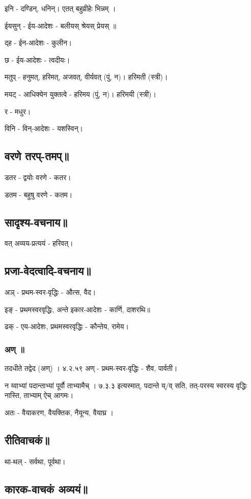 \documentclass[oneside, article]{memoir}
\begin{document}
इनि - दण्डिन्, धनिन्। एतत् बहुव्रीहेः भिन्नम् ।

ईयसुन् - ईय-आदेशः - बलीयस् श्रेयस् प्रेयस् ॥

द्ह - ईन-आदेशः - कुलीन।

छ - ईय-आदेशः - त्वदीयः।

मतुप् - हनुमत्, हरिमत्, अजवत्, वीर्यवत् (पुं, न)। हरिमती (स्त्री)।

मयट् - आधिक्येन युक्तत्वे - हरिमय (पुं, न)। हरिमयी (स्त्री)।

र - मधुर।

विनि - विन्-आदेशः - यशस्विन्।

\subsection{वरणे तरप्-तमप्॥}
डतर - द्वयोः वरणे - कतर।

डतम - बहुषु वरणे - कतम।

\subsection{सादृश्य-वचनाय॥}
वत् अव्यय-प्रत्ययं - हरिवत्।

\subsection{प्रजा-वेदत्वादि-वचनाय॥}
अञ् - प्रथम-स्वर-वृद्धिः - औत्स, वैद।

इङ् - प्रथमस्वरवृद्धिः, अन्ते इकार-आदेशः - कार्णि, दाशरथि॥

ढक् - एय-आदेशः, प्रथमस्वरवृद्धिः - कौन्तेय, रामेय।

\subsubsection{अण् ॥}
तदधीते तद्वेद (अण्) । ४.२.५९
अण् - प्रथम-स्वर-वृद्धिः - शैव, पार्वती।

न य्वाभ्यां पदान्ताभ्यां पूर्वौ ताभ्यामैच् । ७.३.३ इत्यस्मात्, पदान्ते य्/व् सति, तत्-परस्य स्वरस्य वृद्धिः नास्ति, ताभ्याम् ऐच् आगमः।

अतः - वैयाकरण, वैयक्तिक, नैयून्य, वैयाघ्र ।


\subsection{रीतिवाचकं॥}
था-थल् - सर्वथा, पूर्वथा।

\subsection{कारक-वाचकं अव्ययं॥}
\end{document}
